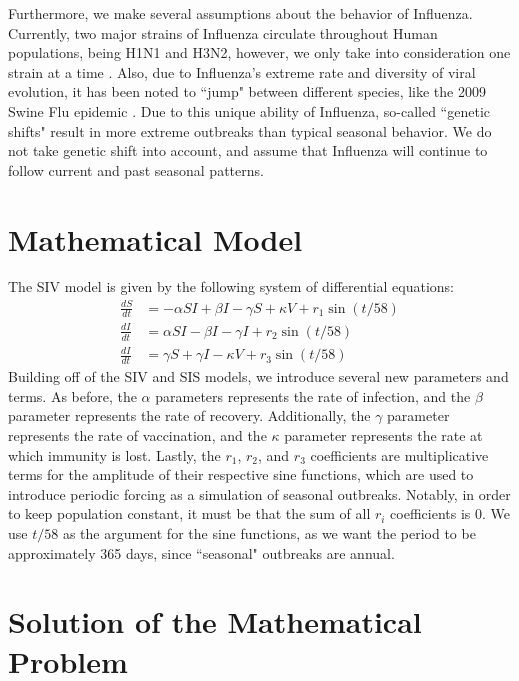 \documentclass[11pt]{article}
\begin{document}
Furthermore, we make several assumptions about the behavior of Influenza. Currently, two major strains of Influenza circulate throughout Human populations, being H1N1 and H3N2, however, we only take into consideration one strain at a time \citep{bedford2015global}. Also, due to Influenza's extreme rate and diversity of viral evolution, it has been noted to ``jump" between different species, like the 2009 Swine Flu epidemic \citep{smith2009origins}. Due to this unique ability of Influenza, so-called ``genetic shifts" result in more extreme outbreaks than typical seasonal behavior. We do not take genetic shift into account, and assume that Influenza will continue to follow current and past seasonal patterns.

\section*{Mathematical Model}

The SIV model is given by the following system of differential equations:
\begin{equation}
\begin{aligned}
\frac{dS}{dt} &= -\alpha S I + \beta I - \gamma S + \kappa V + r_1\sin(t / 58)\\
\frac{dI}{dt} &= \alpha S I - \beta I - \gamma I + r_2\sin(t / 58)\\
\frac{dI}{dt} &= \gamma S + \gamma I - \kappa V + r_3\sin(t / 58)
\end{aligned}
\end{equation}
Building off of the SIV and SIS models, we introduce several new parameters and terms. As before, the $\alpha$ parameters represents the rate of infection, and the $\beta$ parameter represents the rate of recovery. Additionally, the $\gamma$ parameter represents the rate of vaccination, and the $\kappa$ parameter represents the rate at which immunity is lost. Lastly, the $r_1$, $r_2$, and $r_3$ coefficients are multiplicative terms for the amplitude of their respective sine functions, which are used to introduce periodic forcing as a simulation of seasonal outbreaks. Notably, in order to keep population constant, it must be that the sum of all $r_i$ coefficients is $0$. We use $t / 58$ as the argument for the sine functions, as we want the period to be approximately 365 days, since ``seasonal" outbreaks are annual.

\section*{Solution of the Mathematical Problem}
\end{document}
